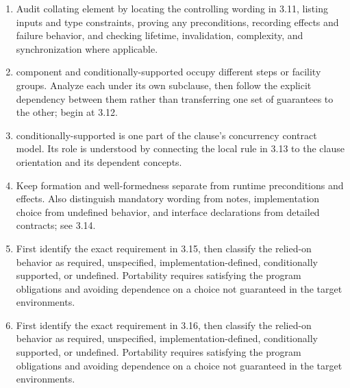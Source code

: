 \documentclass[11pt,letterpaper]{article}
\begin{document}
\begin{enumerate}
\item Audit collating element by locating the controlling wording in 3.11, listing inputs and type constraints, proving any preconditions, recording effects and failure behavior, and checking lifetime, invalidation, complexity, and synchronization where applicable.
\item component and conditionally-supported occupy different steps or facility groups. Analyze each under its own subclause, then follow the explicit dependency between them rather than transferring one set of guarantees to the other; begin at 3.12.
\item conditionally-supported is one part of the clause's concurrency contract model. Its role is understood by connecting the local rule in 3.13 to the clause orientation and its dependent concepts.
\item Keep formation and well-formedness separate from runtime preconditions and effects. Also distinguish mandatory wording from notes, implementation choice from undefined behavior, and interface declarations from detailed contracts; see 3.14.
\item First identify the exact requirement in 3.15, then classify the relied-on behavior as required, unspecified, implementation-defined, conditionally supported, or undefined. Portability requires satisfying the program obligations and avoiding dependence on a choice not guaranteed in the target environments.
\item First identify the exact requirement in 3.16, then classify the relied-on behavior as required, unspecified, implementation-defined, conditionally supported, or undefined. Portability requires satisfying the program obligations and avoiding dependence on a choice not guaranteed in the target environments.
\end{enumerate}
\end{document}
